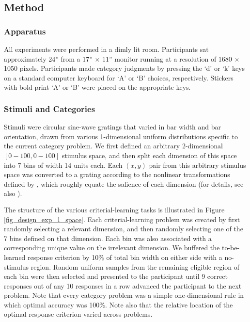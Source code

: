 \documentclass[doc, floatsintext]{apa7}
\begin{document}
\subsection{Method}

\subsubsection{Apparatus}
All experiments were performed in a dimly lit room.
Participants sat approximately 24'' from a 17'' $\times$
11'' monitor running at a resolution of 1680 $\times$ 1050
pixels. Participants made category judgments by pressing the
`d' or `k' keys on a standard computer keyboard for `A' or
`B' choices, respectively. Stickers with bold print `A' or
`B' were placed on the appropriate keys.

\subsubsection{Stimuli and Categories}
Stimuli were circular sine-wave gratings that varied in bar
width and bar orientation, drawn from various 1-dimensional
uniform distributions specific to the current category
problem. We first defined an arbitrary 2-dimensional
$[0-100,0-100]$ stimulus space, and then split each
dimension of this space into 7 bins of width 14 units each.
Each $(x,y)$ pair from this arbitrary stimulus space was
converted to a grating according to the nonlinear
transformations defined by
\textcite{treutwein1989perceptual}, which roughly equate the
salience of each dimension (for details, see also
\textcite{CrossleyAshby2015}).

The structure of the various criterial-learning tasks is
illustrated in Figure \ref{fig_design_exp_1_space}. Each
criterial-learning problem was created by first randomly
selecting a relevant dimension, and then randomly selecting
one of the 7 bins defined on that dimension. Each bin was
also associated with a corresponding unique value on the
irrelevant dimension. We buffered the to-be-learned response
criterion by 10\% of total bin width on either side with a
no-stimulus region. Random uniform samples from the
remaining eligible region of each bin were then selected and
presented to the participant until 9 correct responses out
of any 10 responses in a row advanced the participant to the
next problem. Note that every category problem was a simple
one-dimensional rule in which optimal accuracy was 100\%.
Note also that the relative location of the optimal response
criterion varied across problems.
\end{document}
